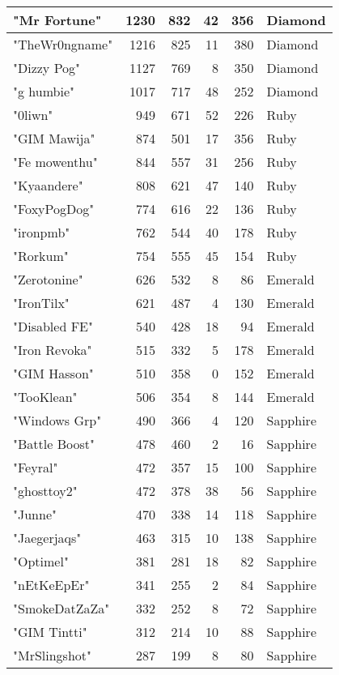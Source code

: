\documentclass{article}
\begin{document}
\begin{table}[htbp]
\begin{tabular}{|l|r|r|r|r|l|}
"Mr Fortune" & 1230 & 832 & 42 & 356 & Diamond \\ \hline
"TheWr0ngname" & 1216 & 825 & 11 & 380 & Diamond \\ \hline
"Dizzy Pog" & 1127 & 769 & 8 & 350 & Diamond \\ \hline
"g humbie" & 1017 & 717 & 48 & 252 & Diamond \\ \hline
"0liwn" & 949 & 671 & 52 & 226 & Ruby \\ \hline
"GIM Mawija" & 874 & 501 & 17 & 356 & Ruby \\ \hline
"Fe mowenthu" & 844 & 557 & 31 & 256 & Ruby \\ \hline
"Kyaandere" & 808 & 621 & 47 & 140 & Ruby \\ \hline
"FoxyPogDog" & 774 & 616 & 22 & 136 & Ruby \\ \hline
"ironpmb" & 762 & 544 & 40 & 178 & Ruby \\ \hline
"Rorkum" & 754 & 555 & 45 & 154 & Ruby \\ \hline
"Zerotonine" & 626 & 532 & 8 & 86 & Emerald \\ \hline
"IronTilx" & 621 & 487 & 4 & 130 & Emerald \\ \hline
"Disabled FE" & 540 & 428 & 18 & 94 & Emerald \\ \hline
"Iron Revoka" & 515 & 332 & 5 & 178 & Emerald \\ \hline
"GIM Hasson" & 510 & 358 & 0 & 152 & Emerald \\ \hline
"TooKlean" & 506 & 354 & 8 & 144 & Emerald \\ \hline
"Windows Grp" & 490 & 366 & 4 & 120 & Sapphire \\ \hline
"Battle Boost" & 478 & 460 & 2 & 16 & Sapphire \\ \hline
"Feyral" & 472 & 357 & 15 & 100 & Sapphire \\ \hline
"ghosttoy2" & 472 & 378 & 38 & 56 & Sapphire \\ \hline
"Junne" & 470 & 338 & 14 & 118 & Sapphire \\ \hline
"Jaegerjaqs" & 463 & 315 & 10 & 138 & Sapphire \\ \hline
"Optimel" & 381 & 281 & 18 & 82 & Sapphire \\ \hline
"nEtKeEpEr" & 341 & 255 & 2 & 84 & Sapphire \\ \hline
"SmokeDatZaZa" & 332 & 252 & 8 & 72 & Sapphire \\ \hline
"GIM Tintti" & 312 & 214 & 10 & 88 & Sapphire \\ \hline
"MrSlingshot" & 287 & 199 & 8 & 80 & Sapphire \\ \hline

\end{tabular}
\end{table}
\end{document}

